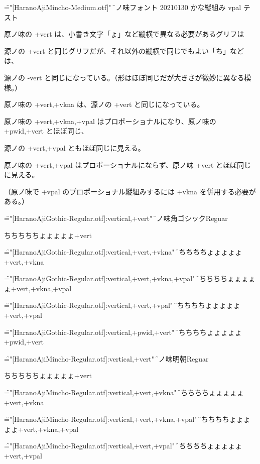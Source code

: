 

\font\f="[HaranoAjiMincho-Medium.otf]"
\f

原ノ味フォント 20210130 かな縦組み vpal テスト

原ノ味の +vert は、小書き文字「ょ」など縦横で異なる必要があるグリフは

源ノの +vert と同じグリフだが、それ以外の縦横で同じでもよい「ち」などは、

源ノの -vert と同じになっている。（形はほぼ同じだが大きさが微妙に異なる模様。）

原ノ味の +vert,+vkna は、源ノの +vert と同じになっている。

原ノ味の +vert,+vkna,+vpal はプロポーショナルになり、原ノ味の
+pwid,+vert とほぼ同じ、

源ノの +vert,+vpal ともほぼ同じに見える。

原ノ味の +vert,+vpal はプロポーショナルにならず、原ノ味
+vert とほぼ同じに見える。

（原ノ味で +vpal のプロポーショナル縦組みするには
+vkna を併用する必要がある。）

\font\f="[HaranoAjiGothic-Regular.otf]:vertical,+vert"
\f
原ノ味角ゴシックReguar

ちちちちちょょょょょ+vert

\font\f="[HaranoAjiGothic-Regular.otf]:vertical,+vert,+vkna"
\f

ちちちちちょょょょょ+vert,+vkna

\font\f="[HaranoAjiGothic-Regular.otf]:vertical,+vert,+vkna,+vpal"
\f
ちちちちちょょょょょ+vert,+vkna,+vpal

\font\f="[HaranoAjiGothic-Regular.otf]:vertical,+vert,+vpal"
\f
ちちちちちょょょょょ+vert,+vpal

\font\f="[HaranoAjiGothic-Regular.otf]:vertical,+pwid,+vert"
\f
ちちちちちょょょょょ+pwid,+vert

\font\f="[HaranoAjiMincho-Regular.otf]:vertical,+vert"
\f
原ノ味明朝Reguar

ちちちちちょょょょょ+vert

\font\f="[HaranoAjiMincho-Regular.otf]:vertical,+vert,+vkna"
\f

ちちちちちょょょょょ+vert,+vkna

\font\f="[HaranoAjiMincho-Regular.otf]:vertical,+vert,+vkna,+vpal"
\f
ちちちちちょょょょょ+vert,+vkna,+vpal

\font\f="[HaranoAjiMincho-Regular.otf]:vertical,+vert,+vpal"
\f
ちちちちちょょょょょ+vert,+vpal

